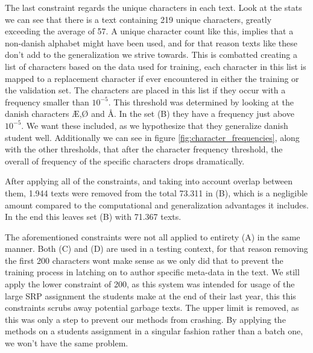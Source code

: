The last constraint regards the unique characters in each text. Look at the
stats we can see that there is a text containing 219 unique characters, greatly
exceeding the average of 57. A unique character count like this, implies that a
non-danish alphabet might have been used, and for that reason texts like these
don't add to the generalization we strive towards. This is combatted creating a
list of characters based on the data used for training, each character in this
list is mapped to a replacement character if ever encountered in either the
training or the validation set. The characters are placed in this list if they
occur with a frequency smaller than $10^{-5}$. This threshold was determined
by looking at the danish characters Æ,Ø and Å. In the set (B) they have
a frequency just above $10^{-5}$. We want these included, as we hypothesize
that they generalize danish student well. Additionally we can see in figure
\ref{fig:character_frequencies}, along with the other thresholds, that after
the character frequency threshold, the overall of frequency of the specific
characters drops dramatically.

After applying all of the constraints, and taking into account
overlap between them, 1.944 texts were removed from the total 73.311 in (B),
which is a negligible amount compared to the computational and generalization
advantages it includes.
In the end this leaves set (B) with 71.367 texts.

The aforementioned constraints were not all applied to entirety (A) in the same
manner. Both (C) and (D) are used in a testing context, for that reason removing
the first 200 characters wont make sense as we only did that to prevent the
training process in latching on to author specific meta-data in the text. We
still apply the lower constraint of 200, as this system was intended for usage
of the large SRP assignment the students make at the end of their last year,
this this constraints scrubs away potential garbage texts. The upper limit
is removed, as this was only a step to prevent our methods from crashing. By
applying the methods on a students assignment in a singular fashion rather than
a batch one, we won't have the same problem.

